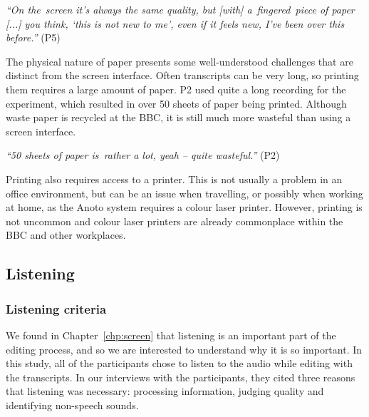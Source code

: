 \textit{``On the screen it's always the same quality, but [with] a fingered piece of paper [...]
you think, `this is not new to me', even if it feels new, I've been over this before.''} (P5)



The physical nature of paper presents some well-understood challenges that are distinct from the screen interface.
Often transcripts can be very long, so printing them requires a large amount of paper. P2 used quite a long recording
for the experiment, which resulted in over 50 sheets of paper being printed. Although waste paper is recycled at the
BBC, it is still much more wasteful than using a screen interface.

\textit{``50 sheets of paper is rather a lot, yeah -- quite wasteful.''} (P2)


Printing also requires access to a printer. This is not usually a problem in an office environment, but can be an issue
when travelling, or possibly when working at home, as the Anoto system requires a colour laser printer. However,
printing is not uncommon and colour laser printers are already commonplace within the BBC and other workplaces.

\subsection{Listening}

\subsubsection{Listening criteria}\label{sec:pen-listening-criteria}


We found in Chapter~\ref{chp:screen} that listening is an important part of the editing process, and so we are
interested to understand why it is so important. In this study, all of the participants chose to listen to the audio
while editing with the transcripts. In our interviews with the participants, they cited three reasons that listening
was necessary: processing information, judging quality and identifying non-speech sounds.

